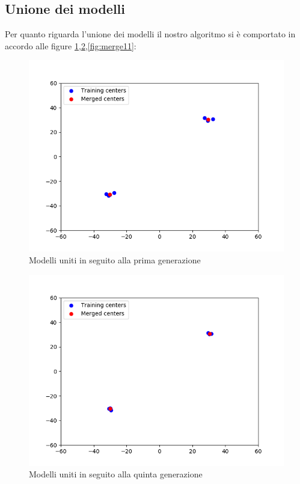 \subsection{Unione dei modelli}
Per quanto riguarda l'unione dei modelli il nostro algoritmo si è comportato in accordo alle  figure \ref{fig:merge1},\ref{fig:merge5},\ref{fig:merge11}:
\begin{figure}[!htb]
  \centering
  \includegraphics[scale=0.6]{../Immagini/merge1.png}
  \caption{Modelli uniti in seguito alla prima generazione}
  \label{fig:merge1}
\end{figure}
\begin{figure}[!htb]
  \centering
  \includegraphics[scale=0.6]{../Immagini/merge5.png}
  \caption{Modelli uniti in seguito alla quinta generazione}
  \label{fig:merge5}
\end{figure}
